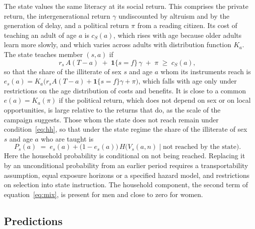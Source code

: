The state values the same literacy at its social return. This comprises the private return, the intergenerational return $\gamma$ undiscounted by altruism and by the generation of delay, and a political return $\pi$ from a reading citizen. Its cost of teaching an adult of age $a$ is $c_S(a)$, which rises with age because older adults learn more slowly, and which varies across adults with distribution function $K_a$. The state teaches member $(s,a)$ if
\begin{equation}\label{eq:state}
  r_s\,A(T-a) \;+\; \mathbf{1}\{s=f\}\,\gamma \;+\; \pi \;\ge\; c_S(a),
\end{equation}
so that the share of the illiterate of sex $s$ and age $a$ whom its instruments reach is $e_s(a)=K_a\big(r_sA(T-a)+\mathbf{1}\{s=f\}\gamma+\pi\big)$, which falls with age only under restrictions on the age distribution of costs and benefits. It is close to a common $e(a)=K_a(\pi)$ if the political return, which does not depend on sex or on local opportunities, is large relative to the returns that do, as the scale of the campaign suggests. Those whom the state does not reach remain under condition~\eqref{eq:hh}, so that under the state regime the share of the illiterate of sex $s$ and age $a$ who are taught is
\begin{equation}\label{eq:mix}
  P_s(a)\;=\;e_s(a)+\big(1-e_s(a)\big)\,H\big(V_s(a,n)\mid\text{not reached by the state}\big).
\end{equation}
Here the household probability is conditional on not being reached. Replacing it by an unconditional probability from an earlier period requires a transportability assumption, equal exposure horizons or a specified hazard model, and restrictions on selection into state instruction. The household component, the second term of equation~\eqref{eq:mix}, is present for men and close to zero for women.

\subsection{Predictions}

